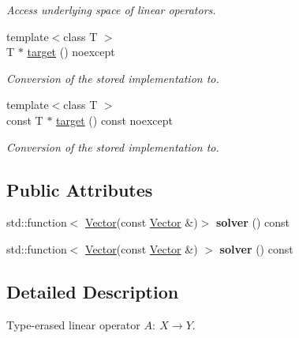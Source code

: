 \begin{DoxyCompactItemize}
\begin{DoxyCompactList}\small\item\em \-Access underlying space of linear operators. \end{DoxyCompactList}\item 
{\footnotesize template$<$class T $>$ }\\\-T $\ast$ \hyperlink{classSpacy_1_1LinearOperator_a74d3f8b5e058d6df4921f63c9023f01c}{target} () noexcept
\begin{DoxyCompactList}\small\item\em \-Conversion of the stored implementation to. \end{DoxyCompactList}\item 
{\footnotesize template$<$class T $>$ }\\const \-T $\ast$ \hyperlink{classSpacy_1_1LinearOperator_a275563d8e433f8d714e84022f8f130a3}{target} () const noexcept
\begin{DoxyCompactList}\small\item\em \-Conversion of the stored implementation to. \end{DoxyCompactList}\end{DoxyCompactItemize}
\subsection*{\-Public \-Attributes}
\begin{DoxyCompactItemize}
\item 
\hypertarget{classSpacy_1_1LinearOperator_a8ff75bb0ca4fa981e292e4768e4a2cc1}{std\-::function$<$ \hyperlink{classSpacy_1_1Vector}{\-Vector}(const \*
\hyperlink{classSpacy_1_1Vector}{\-Vector} \&)$>$ {\bfseries solver} () const }\label{classSpacy_1_1LinearOperator_a8ff75bb0ca4fa981e292e4768e4a2cc1}

\item 
\hypertarget{classSpacy_1_1LinearOperator_ab9b19859725956cf136806610a56cd92}{std\-::function$<$ \hyperlink{classSpacy_1_1Vector}{\-Vector}(const \*
\hyperlink{classSpacy_1_1Vector}{\-Vector} \&) $>$ {\bfseries solver} () const }\label{classSpacy_1_1LinearOperator_ab9b19859725956cf136806610a56cd92}

\end{DoxyCompactItemize}


\subsection{\-Detailed \-Description}
\-Type-\/erased linear operator $A:\ X \to Y $. 

